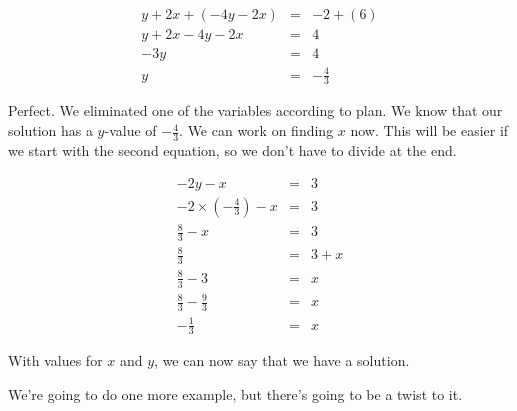 \begin{example}
$$\begin{array}{rcl}
y + 2x + (-4y - 2x) & = & -2 + (6) \\
y + 2x -4y -2x & = & 4 \\
-3y & = & 4 \\
y & = & -\frac{4}{3}
\end{array}$$

Perfect.  We eliminated one of the variables according to plan.  We know that our solution has a $y$-value of $-\frac{4}{3}$.  We can work on finding $x$ now.  This will be easier if we start with the second equation, so we don't have to divide at the end.

$$\begin{array}{rcl}
-2y - x & = & 3 \\
-2\times \left(-\frac{4}{3}\right) - x & = & 3 \\
\frac{8}{3} - x & = & 3 \\
\frac{8}{3} & = & 3 + x \\
\frac{8}{3} - 3 & = & x \\
\frac{8}{3} - \frac{9}{3} & = & x \\
-\frac{1}{3} & = & x \end{array}$$

With values for $x$ and $y$, we can now say that we have a solution.
\end{example}

We're going to do one more example, but there's going to be a twist to it.

